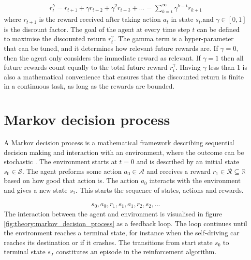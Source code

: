 \documentclass[class=book, crop=false]{standalone}
\begin{document}
\begin{equation}
   \begin{aligned}\label{eq:theory:discounted_reward}
r^{\gamma}_{t} = r_{t+1} + \gamma r_{t+2} + \gamma^{2} r_{t+3} + ...
= \sum_{k=t}^{\infty} \gamma^{k-t}r_{k+1}
\end{aligned} 
\end{equation}
where $r_{t+1}$ is the reward received after taking action $a_{t}$ in state $s_{t}$,and $\gamma \in [0,1]$ is the discount factor. The goal of the agent at every time step $t$ can be defined to maximise the discounted return $r^{\gamma}_{t}$. The gamma term is a hyper-parameter that can be tuned, and it determines how relevant future rewards are. If $\gamma = 0$, then the agent only considers the immediate reward as relevant. If $\gamma = 1$ then all future rewards count equally to the total future reward $r^{\gamma}_{t}$. Having $\gamma$ less than 1 is also a mathematical convenience that ensures that the discounted return is finite in a continuous task, as long as the rewards are bounded. 

\section{Markov decision process}\label{section:markov_decision_process}

A Markov decision process is a mathematical framework describing sequential decision making and interaction with an environment, where the outcome can be stochastic \cite{Sutton1998}. The environment starts at $t=0$ and is described by an initial state $s_{0} \in \mathcal{S}$. The agent preforms some action $a_{0}\in \mathcal{A}$ and receives a reward $r_{1}\in \mathcal{R} \subseteq \mathbb{R} $ based on how good that action is. The action $a_{0}$ interacts with the environment and gives a new state $s_{1}$. This starts the sequence of states, actions and rewards.


\begin{equation}
   \begin{aligned}\label{eq:theory:trajectory}
s_{0},a_{0},r_{1},s_{1}, a_{1},r_{2},s_{2},...
\end{aligned} 
\end{equation}
The interaction between the agent and environment is visualised in figure \ref{fig:theory:markov_decision_process} as a feedback loop. The loop continues until the environment reaches a terminal state, for instance when the self-driving car reaches its destination or if it crashes. The transitions from start state $s_{0}$ to terminal state $s_{T}$ constitutes an episode in the reinforcement algorithm.  
\end{document}
